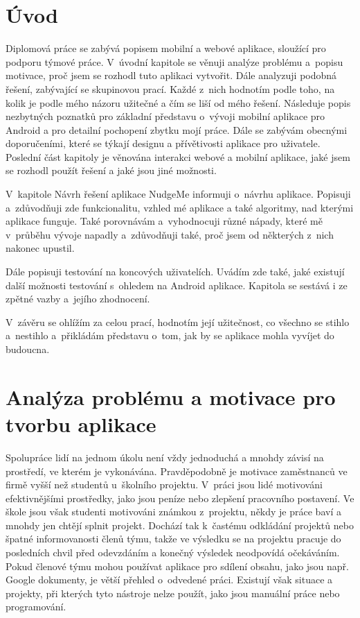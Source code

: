 
\chapter{Úvod}
Diplomová práce se zabývá popisem mobilní a webové aplikace, sloužící pro podporu týmové práce. V~úvodní kapitole se věnuji analýze problému a~popisu motivace, proč jsem se rozhodl tuto aplikaci vytvořit. Dále analyzuji podobná řešení, zabývající se skupinovou prací. Každé z~nich hodnotím podle toho, na kolik je podle mého názoru užitečné a čím se liší od mého řešení. Následuje popis nezbytných poznatků pro základní představu o~vývoji mobilní aplikace pro Android a pro detailní pochopení zbytku mojí práce. Dále se zabývám obecnými doporučeními, které se týkají designu a přívětivosti aplikace pro uživatele. Poslední část kapitoly je věnována interakci webové a mobilní aplikace, jaké jsem se rozhodl použít řešení a jaké jsou jiné možnosti.

V~kapitole Návrh řešení aplikace NudgeMe informuji o~návrhu aplikace. Popisuji a~zdůvodňuji zde funkcionalitu, vzhled mé aplikace a také algoritmy, nad kterými aplikace funguje. Také porovnávám a~vyhodnocuji různé nápady, které mě v~průběhu vývoje napadly a~zdůvodňuji také, proč jsem od některých z~nich nakonec upustil. 

Dále popisuji testování na koncových uživatelích. Uvádím zde také, jaké existují další možnosti testování s~ohledem na Android aplikace. Kapitola se sestává i ze zpětné vazby a~jejího zhodnocení. 

V~závěru se ohlížím za celou prací, hodnotím její užitečnost, co všechno se stihlo a~nestihlo a~přikládám představu o~tom, jak by se aplikace mohla vyvíjet do budoucna.

\chapter{Analýza problému a motivace pro tvorbu aplikace}

Spolupráce lidí na jednom úkolu není vždy jednoduchá a mnohdy závisí na prostředí, ve kterém je vykonávána. Pravděpodobně je motivace zaměstnanců ve firmě vyšší než studentů u~školního projektu. V~práci jsou lidé motivováni efektivnějšími prostředky, jako jsou peníze nebo zlepšení pracovního postavení. Ve škole jsou však studenti motivováni známkou z~projektu, někdy je práce baví a mnohdy jen chtějí splnit projekt. Dochází tak k~častému odkládání projektů nebo špatné informovanosti členů týmu, takže ve výsledku se na projektu pracuje do posledních chvil před odevzdáním a konečný výsledek neodpovídá očekáváním. Pokud členové týmu mohou používat aplikace pro sdílení obsahu, jako jsou např. Google dokumenty, je větší přehled o~odvedené práci. Existují však situace a projekty, při kterých tyto nástroje nelze použít, jako jsou manuální práce nebo programování. 

